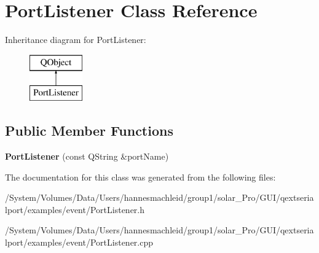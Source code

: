 \hypertarget{class_port_listener}{}\section{Port\+Listener Class Reference}
\label{class_port_listener}
Inheritance diagram for Port\+Listener\+:\begin{figure}[H]
\begin{center}
\leavevmode
\includegraphics[height=2.000000cm]{class_port_listener}
\end{center}
\end{figure}
\subsection*{Public Member Functions}
\begin{DoxyCompactItemize}
\item 
\mbox{\label{class_port_listener_ad8bab517cd3d60ac6a8145d0258e412e}} 
{\bfseries Port\+Listener} (const Q\+String \&port\+Name)
\end{DoxyCompactItemize}


The documentation for this class was generated from the following files\+:\begin{DoxyCompactItemize}
\item 
/\+System/\+Volumes/\+Data/\+Users/hannesmachleid/group1/solar\+\_\+\+Pro/\+G\+U\+I/qextserialport/examples/event/Port\+Listener.\+h\item 
/\+System/\+Volumes/\+Data/\+Users/hannesmachleid/group1/solar\+\_\+\+Pro/\+G\+U\+I/qextserialport/examples/event/Port\+Listener.\+cpp\end{DoxyCompactItemize}
